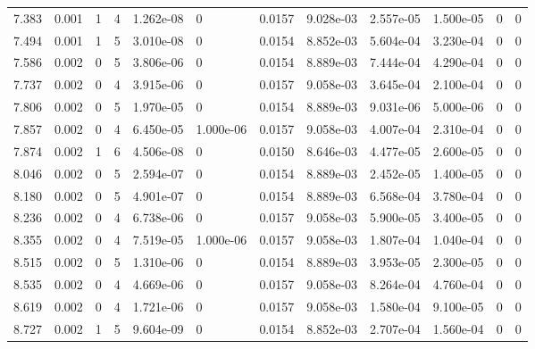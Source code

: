 \documentclass[preview]{standalone}
\begin{document}
{{{\begin{tabular}{L{1.2cm}C{1.2cm} C{0.3cm}C{0.5cm} C{1.4cm}C{1.4cm} C{1.4cm}C{1.4cm} C{1.6cm}C{1.6cm} C{1.6cm}C{1.6cm}}
  7.383  &  0.001  & 1     &  4 &  1.262e-08  & 0  &  0.0157&   9.028e-03& 2.557e-05 & 1.500e-05   &  0 & 0  \\ 
  7.494  &  0.001  & 1     &  5 &  3.010e-08  & 0  &  0.0154&   8.852e-03& 5.604e-04 & 3.230e-04   &  0 & 0  \\ 
  7.586  &  0.002  & 0     &  5 &  3.806e-06  & 0  &  0.0154&   8.889e-03& 7.444e-04 & 4.290e-04   &  0 & 0  \\ 
  7.737  &  0.002  & 0     &  4 &  3.915e-06  & 0  &  0.0157&   9.058e-03& 3.645e-04 & 2.100e-04   &  0 & 0  \\ 
  7.806  &  0.002  & 0     &  5 &  1.970e-05  & 0  &  0.0154&   8.889e-03& 9.031e-06 & 5.000e-06   &  0 & 0  \\ 
  7.857  &  0.002  & 0     &  4 &  6.450e-05  & 1.000e-06  &  0.0157&   9.058e-03& 4.007e-04 & 2.310e-04   &  0 & 0  \\ 
  7.874  &  0.002  & 1     &  6 &  4.506e-08  & 0  &  0.0150&   8.646e-03& 4.477e-05 & 2.600e-05   &  0 & 0  \\ 
  8.046  &  0.002  & 0     &  5 &  2.594e-07  & 0  &  0.0154&   8.889e-03& 2.452e-05 & 1.400e-05   &  0 & 0  \\ 
  8.180  &  0.002  & 0     &  5 &  4.901e-07  & 0  &  0.0154&   8.889e-03& 6.568e-04 & 3.780e-04   &  0 & 0  \\ 
  8.236  &  0.002  & 0     &  4 &  6.738e-06  & 0  &  0.0157&   9.058e-03& 5.900e-05 & 3.400e-05   &  0 & 0  \\ 
  8.355  &  0.002  & 0     &  4 &  7.519e-05  & 1.000e-06  &  0.0157&   9.058e-03& 1.807e-04 & 1.040e-04   &  0 & 0  \\ 
  8.515  &  0.002  & 0     &  5 &  1.310e-06  & 0  &  0.0154&   8.889e-03& 3.953e-05 & 2.300e-05   &  0 & 0  \\ 
  8.535  &  0.002  & 0     &  4 &  4.669e-06  & 0  &  0.0157&   9.058e-03& 8.264e-04 & 4.760e-04   &  0 & 0  \\ 
  8.619  &  0.002  & 0     &  4 &  1.721e-06  & 0  &  0.0157&   9.058e-03& 1.580e-04 & 9.100e-05   &  0 & 0  \\ 
  8.727  &  0.002  & 1     &  5 &  9.604e-09  & 0  &  0.0154&   8.852e-03& 2.707e-04 & 1.560e-04   &  0 & 0  \\ 
\hline 
\end{tabular} 

}}}
\end{document}
